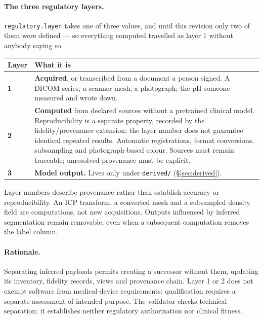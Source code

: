 \documentclass[11pt,a4paper]{article}
\newcommand{\code}[1]{\texttt{\small #1}}
\begin{document}
\paragraph{The three regulatory layers.}
\code{regulatory.layer} takes one of three values, and until this revision only two of
them were defined --- so everything computed travelled as layer 1 without anybody saying
so.

\begin{longtable}{L{1.4cm} L{13.9cm}}
\toprule
\textbf{Layer} & \textbf{What it is}\\
\midrule
\endhead
\textbf{1} & \textbf{Acquired}, or transcribed from a document a person signed. A DICOM
series, a scanner mesh, a photograph; the pH someone measured and wrote down.\\
\textbf{2} & \textbf{Computed} from declared sources without a pretrained clinical
model. Reproducibility is a separate property, recorded by the fidelity/provenance
extension; the layer number does not guarantee identical repeated results.
Automatic registrations, format conversions, subsampling and photograph-based colour.
Sources must remain traceable; unresolved provenance must be explicit.\\
\textbf{3} & \textbf{Model output.} Lives only under \code{derived/}
(\S\ref{sec:derived}).\\
\bottomrule
\end{longtable}

Layer numbers describe provenance rather than establish accuracy or reproducibility.
An ICP transform, a converted mesh and a subsampled density field are computations,
not new acquisitions. Outputs influenced by inferred segmentation remain removable,
even when a subsequent computation removes the label column.

\paragraph{Rationale.} Separating inferred payloads permits creating a successor
without them, updating its inventory, fidelity records, views and provenance chain.
Layer 1 or 2 does not exempt software from medical-device requirements: qualification
requires a separate assessment of intended purpose. The validator checks technical
separation; it establishes neither regulatory authorization nor clinical fitness.
\end{document}
